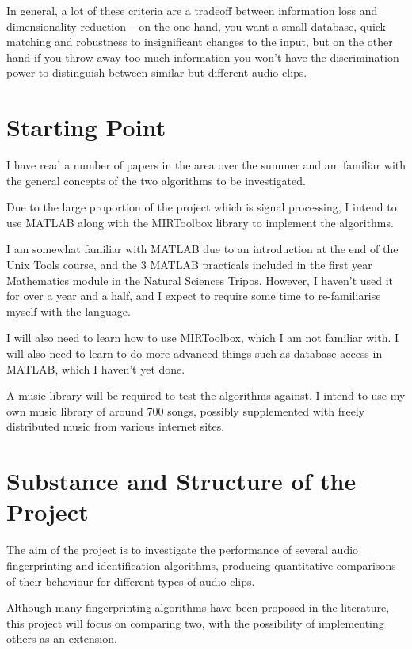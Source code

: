 \documentclass[12pt]{article}
\begin{document}
In general, a lot of these criteria are a tradeoff between information loss and dimensionality reduction -- on the one hand, you want a small database, quick matching and robustness to insignificant changes to the input, but on the other hand if you throw away too much information you won't have the discrimination power to distinguish between similar but different audio clips.


\section*{Starting Point}

I have read a number of papers in the area over the summer and am familiar with the general concepts of the two algorithms to be investigated. 

Due to the large proportion of the project which is signal processing, I intend to use MATLAB along with the MIRToolbox library to implement the algorithms.

I am somewhat familiar with MATLAB due to an introduction at the end of the Unix Tools course, and the 3 MATLAB practicals included in the first year Mathematics module in the Natural Sciences Tripos. However, I haven't used it for over a year and a half, and I expect to require some time to re-familiarise myself with the language.

I will also need to learn how to use MIRToolbox, which I am not familiar with. I will also need to learn to do more advanced things such as database access in MATLAB, which I haven't yet done.

A music library will be required to test the algorithms against. I intend to use my own music library of around 700 songs, possibly supplemented with freely distributed music from various internet sites. 

\section*{Substance and Structure of the Project}

The aim of the project is to investigate the performance of several audio fingerprinting and identification algorithms, producing quantitative comparisons of their behaviour for different types of audio clips. 

Although many fingerprinting algorithms have been proposed in the literature, this project will focus on comparing two, with the possibility of implementing others as an extension. 
\end{document}
